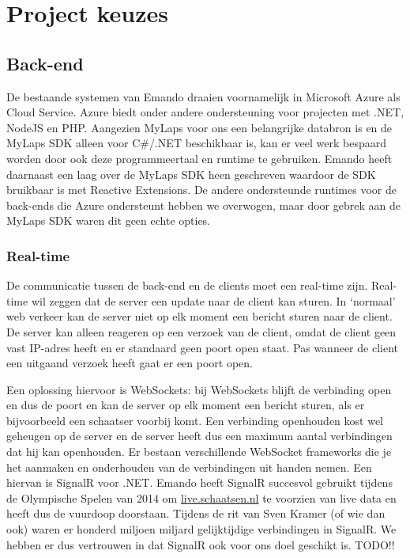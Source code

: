 \section{Project keuzes}

\subsection{Back-end}

De bestaande systemen van Emando draaien voornamelijk in Microsoft Azure als Cloud Service. Azure biedt onder andere ondersteuning voor projecten met .NET, NodeJS en PHP. Aangezien MyLaps voor ons een belangrijke databron is en de MyLaps SDK alleen voor C\#/.NET beschikbaar is, kan er veel werk bespaard worden door ook deze programmeertaal en runtime te gebruiken. Emando heeft daarnaast een laag over de MyLaps SDK heen geschreven waardoor de SDK bruikbaar is met Reactive Extensions. De andere ondersteunde runtimes voor de back-ends die Azure ondersteunt hebben we overwogen, maar door gebrek aan de MyLaps SDK waren dit geen echte opties.

\subsubsection{Real-time}
De communicatie tussen de back-end en de clients moet een real-time zijn. Real-time wil zeggen dat de server een update naar de client kan sturen. In `normaal' web verkeer kan de server niet op elk moment een bericht sturen naar de client. De server kan alleen reageren op een verzoek van de client, omdat de client geen vast IP-adres heeft en er standaard geen poort open staat. Pas wanneer de client een uitgaand verzoek heeft gaat er een poort open.

Een oplossing hiervoor is WebSockets: bij WebSockets blijft de verbinding open en dus de poort en kan de server op elk moment een bericht sturen, als er bijvoorbeeld een schaatser voorbij komt. Een verbinding openhouden kost wel geheugen op de server en de server heeft dus een maximum aantal verbindingen dat hij kan openhouden. Er bestaan verschillende WebSocket frameworks die je het aanmaken en onderhouden van de verbindingen uit handen nemen. Een hiervan is SignalR voor .NET. Emando heeft SignalR succesvol gebruikt tijdens de Olympische Spelen van 2014 om \url{live.schaatsen.nl} te voorzien van live data en heeft dus de vuurdoop doorstaan. Tijdens de rit van Sven Kramer (of wie dan ook) waren er honderd miljoen miljard gelijktijdige verbindingen in SignalR. We hebben er dus vertrouwen in dat SignalR ook voor ons doel geschikt is. TODO!!

